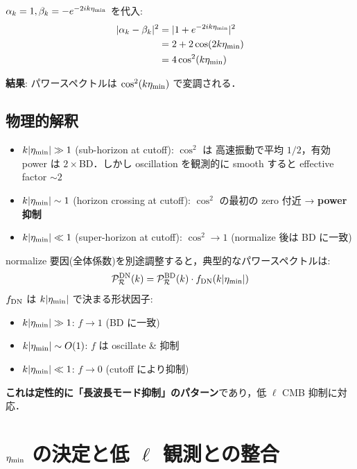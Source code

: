\documentclass[11pt,a4paper]{article}
\begin{document}
$\alpha_k = 1, \beta_k = -e^{-2ik\eta_{\rm min}}$ を代入:
\begin{align}
|\alpha_k - \beta_k|^2 &= |1 + e^{-2ik\eta_{\rm min}}|^2\\
&= 2 + 2\cos(2k\eta_{\rm min})\\
&= 4\cos^2(k\eta_{\rm min})
\end{align}

\textbf{結果}: パワースペクトルは $\cos^2(k\eta_{\rm min})$ で変調される．

\subsection{物理的解釈}

\begin{itemize}
\item $k|\eta_{\rm min}| \gg 1$ (sub-horizon at cutoff): $\cos^2$ は
高速振動で平均 $1/2$，有効 power は $2\times$BD．しかし
oscillation を観測的に smooth すると effective factor $\sim 2$
\item $k|\eta_{\rm min}| \sim 1$ (horizon crossing at cutoff):
$\cos^2$ の最初の zero 付近 → \textbf{power 抑制}
\item $k|\eta_{\rm min}| \ll 1$ (super-horizon at cutoff):
$\cos^2 \to 1$ (normalize 後は BD に一致)
\end{itemize}

normalize 要因(全体係数)を別途調整すると，典型的なパワースペクトルは:
\begin{equation}
\mathcal{P}^{\rm DN}_{\mathcal{R}}(k) = \mathcal{P}^{\rm BD}_{\mathcal{R}}(k)
\cdot f_{\rm DN}(k|\eta_{\rm min}|)
\end{equation}
$f_{\rm DN}$ は $k|\eta_{\rm min}|$ で決まる形状因子:
\begin{itemize}
\item $k|\eta_{\rm min}| \gg 1$: $f \to 1$ (BD に一致)
\item $k|\eta_{\rm min}| \sim O(1)$: $f$ は oscillate & 抑制
\item $k|\eta_{\rm min}| \ll 1$: $f \to 0$ (cutoff により抑制)
\end{itemize}

\textbf{これは定性的に「長波長モード抑制」のパターン}であり，低 $\ell$
CMB 抑制に対応．

\section{$\eta_{\rm min}$ の決定と低 $\ell$ 観測との整合}
\end{document}
